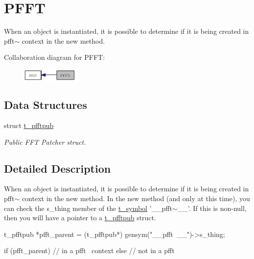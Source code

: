 \hypertarget{group__pfft}{
\section{PFFT}
\label{group__pfft}
}


When an object is instantiated, it is possible to determine if it is being created in pfft$\sim$ context in the new method.  


Collaboration diagram for PFFT:\nopagebreak
\begin{figure}[H]
\begin{center}
\leavevmode
\includegraphics[width=80pt]{group__pfft}
\end{center}
\end{figure}
\subsection*{Data Structures}
\begin{DoxyCompactItemize}
\item 
struct \hyperlink{structt__pfftpub}{t\_\-pfftpub}
\begin{DoxyCompactList}\small\item\em Public FFT Patcher struct. \item\end{DoxyCompactList}\end{DoxyCompactItemize}


\subsection{Detailed Description}
When an object is instantiated, it is possible to determine if it is being created in pfft$\sim$ context in the new method. In the new method (and only at this time), you can check the s\_\-thing member of the \hyperlink{structt__symbol}{t\_\-symbol} '\_\-\_\-pfft$\sim$\_\-\_\-'. If this is non-\/null, then you will have a pointer to a \hyperlink{structt__pfftpub}{t\_\-pfftpub} struct.


\begin{DoxyCode}
    t_pfftpub *pfft_parent = (t_pfftpub*) gensym("__pfft~__")->s_thing;

    if (pfft_parent) {
        // in a pfft~ context
    }
    else {
        // not in a pfft~
    }
\end{DoxyCode}
 
